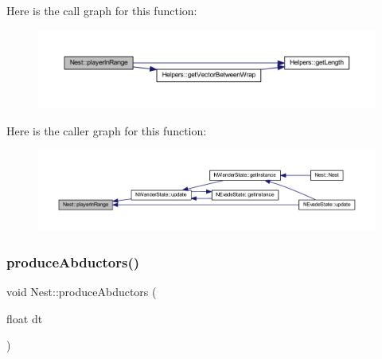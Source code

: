 Here is the call graph for this function\+:
\nopagebreak
\begin{figure}[H]
\begin{center}
\leavevmode
\includegraphics[width=350pt]{class_nest_a2a6648d13e1eb6b8634f6f0b618d6da3_cgraph}
\end{center}
\end{figure}
Here is the caller graph for this function\+:
\nopagebreak
\begin{figure}[H]
\begin{center}
\leavevmode
\includegraphics[width=350pt]{class_nest_a2a6648d13e1eb6b8634f6f0b618d6da3_icgraph}
\end{center}
\end{figure}
\mbox{\label{class_nest_aa3b2b3ff5ebbf25c942e2622130d8446}} 
\subsubsection{\texorpdfstring{produce\+Abductors()}{produceAbductors()}}
{\footnotesize\ttfamily void Nest\+::produce\+Abductors (\begin{DoxyParamCaption}\item[{float}]{dt }\end{DoxyParamCaption})}

